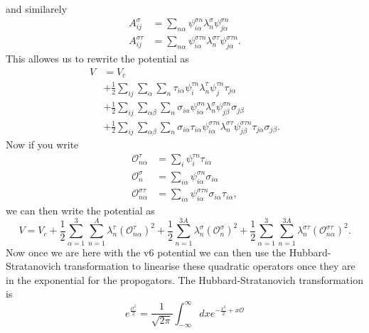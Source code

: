 \documentclass[12pt]{extarticle}
\newcommand{\Ot}{\mathcal{O}^\tau_{n\alpha}}
\newcommand{\Os}{\mathcal{O}^\sigma_{n}}
\newcommand{\Ost}{\mathcal{O}^{\sigma\tau}_{n\alpha}}
\begin{document}
and similarely
\begin{align}
  A^\sigma_{ij} &= \sum_{n \alpha} \psi^{\sigma n}_{i \alpha} \lambda^\sigma_n \psi^{\sigma n}_{j \alpha} \\
  A^{\sigma\tau}_{ij} &= \sum_{n \alpha} \psi^{\sigma\tau n}_{i \alpha} \lambda^{\sigma\tau}_n \psi^{\sigma\tau n}_{j \alpha}.
\end{align}
This allowes us to rewrite the potential as 
\begin{equation}
\begin{split}
  V &= V_c \\
  &+ \frac{1}{2}\sum_{ij}\sum_{\alpha}\sum_{n}\tau_{i\alpha}\psi^{\tau n}_{i}\lambda^\tau_n\psi^{\tau n}_{j}\tau_{j\alpha} \\
  &+ \frac{1}{2}\sum_{ij}\sum_{\alpha\beta}\sum_{n}\sigma_{i\alpha}\psi^{\sigma n}_{i\alpha}\lambda^\sigma_n\psi^{\sigma n}_{j\beta}\sigma_{j\beta} \\
  &+ \frac{1}{2}\sum_{ij}\sum_{\alpha\beta}\sum_{n}\sigma_{i\alpha}\tau_{i\alpha}\psi^{\sigma\tau n}_{i\alpha}\lambda^{\sigma\tau}_n\psi^{\sigma\tau n}_{j\beta}\tau_{j\alpha}\sigma_{j\beta}.
\end{split}
\end{equation}
Now if you write 
\begin{align}
  \Ot &= \sum_i \psi_i^{\tau n} \tau_{i\alpha} \\
  \Os &= \sum_{i\alpha} \psi_{i\alpha}^{\sigma n} \sigma_{i\alpha} \\
  \Ost &= \sum_{i\alpha} \psi_{i\alpha}^{\sigma\tau n} \sigma_{i\alpha}\tau_{i\alpha},
\end{align}
we can then write the potential as
\begin{equation}
  V = V_c + \frac{1}{2}\sum_{\alpha=1}^3\sum_{n=1}^A \lambda^\tau_n (\Ot)^2 + \frac{1}{2}\sum_{n=1}^{3A} \lambda^\sigma_n (\Os)^2 + \frac{1}{2}\sum_{\alpha=1}^3\sum_{n=1}^{3A} \lambda^{\sigma\tau}_n (\Ost)^2.
\end{equation}
Now once we are here with the v6 potential we can then use the Hubbard-Stratanovich transformation to linearise these quadratic operators once they are in the exponential for the propogators. The Hubbard-Stratanovich transformation is
\begin{equation}
  e^{\frac{\mathcal{O}^2}{2}} = \frac{1}{\sqrt{2\pi}} \int_{-\infty}^{\infty} dx e^{-\frac{x^2}{2} + x\mathcal{O}}
\end{equation}



\end{document}
